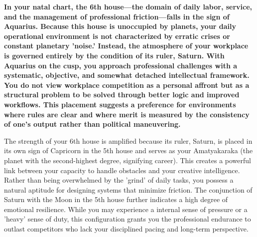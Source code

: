
\label{topic15}

{\fontsize{9.5}{13.8}\selectfont\bfseries\color{DeepSlate} In your natal chart, the 6th house---the domain of daily labor, service, and the management of professional friction---falls in the sign of Aquarius. Because this house is unoccupied by planets, your daily operational environment is not characterized by erratic crises or constant planetary 'noise.' Instead, the atmosphere of your workplace is governed entirely by the condition of its ruler, Saturn. With Aquarius on the cusp, you approach professional challenges with a systematic, objective, and somewhat detached intellectual framework. You do not view workplace competition as a personal affront but as a structural problem to be solved through better logic and improved workflows. This placement suggests a preference for environments where rules are clear and where merit is measured by the consistency of one's output rather than political maneuvering.}\par\vspace{2mm}

{\fontsize{9}{13}\selectfont The strength of your 6th house is amplified because its ruler, Saturn, is placed in its own sign of Capricorn in the 5th house and serves as your Amatyakaraka (the planet with the second-highest degree, signifying career). This creates a powerful link between your capacity to handle obstacles and your creative intelligence. Rather than being overwhelmed by the 'grind' of daily tasks, you possess a natural aptitude for designing systems that minimize friction. The conjunction of Saturn with the Moon in the 5th house further indicates a high degree of emotional resilience. While you may experience a internal sense of pressure or a 'heavy' sense of duty, this configuration grants you the professional endurance to outlast competitors who lack your disciplined pacing and long-term perspective.}\par\vspace{1.8mm}

